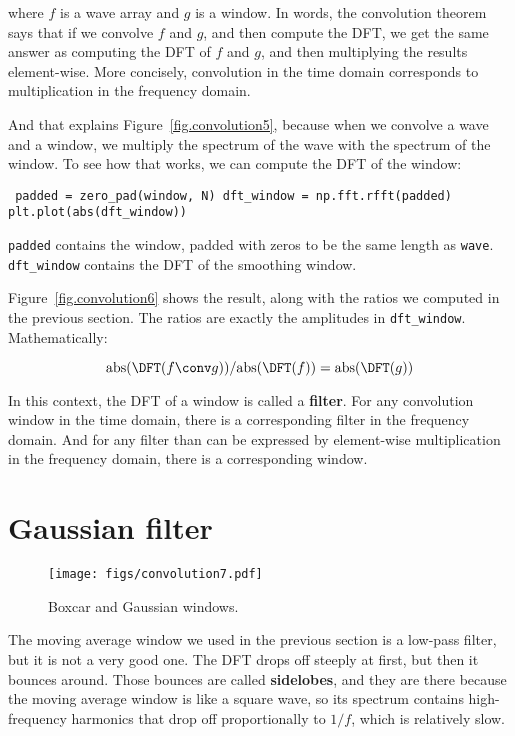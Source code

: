 \documentclass[12pt]{book} \usepackage[width=5.5in,height=8.5in, hmarginratio=3:2,vmarginratio=1:1]{geometry}
\begin{document}
%
where $f$ is a wave array and $g$ is a window. In words, the convolution theorem says that if we convolve $f$ and $g$, and then compute the DFT, we get the same answer as computing the DFT of $f$ and $g$, and then multiplying the results element-wise. More concisely, convolution in the time domain corresponds to multiplication in the frequency domain. 

And that explains Figure~\ref{fig.convolution5}, because when we convolve a wave and a window, we multiply the spectrum of the wave with the spectrum of the window. To see how that works, we can compute the DFT of the window: 

\begin{verbatim} padded = zero_pad(window, N) dft_window = np.fft.rfft(padded) plt.plot(abs(dft_window)) \end{verbatim} 

{\tt padded} contains the window, padded with zeros to be the same length as {\tt wave}. \verb"dft_window" contains the DFT of the smoothing window. 

\newcommand{\abs}{\mathrm{abs}} 

Figure~\ref{fig.convolution6} shows the result, along with the ratios we computed in the previous section. The ratios are exactly the amplitudes in \verb"dft_window". Mathematically: 

%
\[ \abs(\DFT(f \conv g)) / \abs(\DFT(f)) = \abs(\DFT(g)) \] 

%
In this context, the DFT of a window is called a {\bf filter}. For any convolution window in the time domain, there is a corresponding filter in the frequency domain. And for any filter than can be expressed by element-wise multiplication in the frequency domain, there is a corresponding window. 

\section{Gaussian filter} 

\begin{figure} 

\centerline{\texttt{[image: figs/convolution7.pdf]}} \caption{Boxcar and Gaussian windows.} \label{fig.convolution7} \end{figure} 

The moving average window we used in the previous section is a low-pass filter, but it is not a very good one. The DFT drops off steeply at first, but then it bounces around. Those bounces are called {\bf sidelobes}, and they are there because the moving average window is like a square wave, so its spectrum contains high-frequency harmonics that drop off proportionally to $1/f$, which is relatively slow. 
\end{document}

